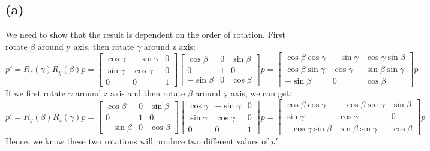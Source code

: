 \documentclass[letterpaper]{article}
\begin{document}
\subsection*{(a)}
We need to show that the result is dependent on the order of rotation. First rotate $\beta$ around y axis, then rotate $\gamma$ around z axis:
$$p' = R_z(\gamma)R_y(\beta)p = 
\begin{bmatrix}
\cos{\gamma} & -\sin{\gamma} & 0\\
\sin{\gamma} & \cos{\gamma} & 0\\
0 & 0 & 1
\end{bmatrix}
\begin{bmatrix}
\cos{\beta} & 0 & \sin{\beta}\\
0 & 1 & 0\\
-\sin{\beta} & 0 & \cos{\beta}
\end{bmatrix}p = 
\begin{bmatrix}
\cos{\beta}\cos{\gamma} & -\sin{\gamma} & \cos{\gamma}\sin{\beta}\\
\cos{\beta}\sin{\gamma} & \cos{\gamma} & \sin{\beta}\sin{\gamma}\\
-\sin{\beta} & 0 & \cos{\beta}
\end{bmatrix}
p
$$
If we first rotate $\gamma$ around z axis and then rotate $\beta$ around y axis, we can get:
$$p' = R_y(\beta)R_z(\gamma)p = 
\begin{bmatrix}
\cos{\beta} & 0 & \sin{\beta}\\
0 & 1 & 0\\
-\sin{\beta} & 0 & \cos{\beta}
\end{bmatrix}
\begin{bmatrix}
\cos{\gamma} & -\sin{\gamma} & 0\\
\sin{\gamma} & \cos{\gamma} & 0\\
0 & 0 & 1
\end{bmatrix}p = 
\begin{bmatrix}
\cos{\beta}\cos{\gamma} & -\cos{\beta}\sin{\gamma} & \sin{\beta}\\
\sin{\gamma} & \cos{\gamma} & 0\\
-\cos{\gamma}\sin{\beta} & \sin{\beta}\sin{\gamma} & \cos{\beta}
\end{bmatrix}
p
$$
Hence, we know these two rotations will produce two different values of $p'$.
\end{document}
